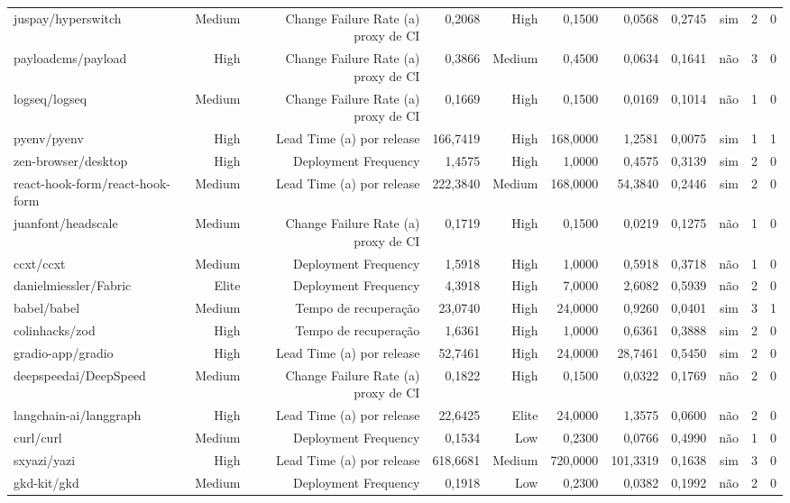 \begin{tabular}{lrrrrrrrrrr}
juspay/hyperswitch & Medium & Change Failure Rate (a) proxy de CI & 0,2068 & High & 0,1500 & 0,0568 & 0,2745 & sim & 2 & 0 \\
payloadcms/payload & High & Change Failure Rate (a) proxy de CI & 0,3866 & Medium & 0,4500 & 0,0634 & 0,1641 & não & 3 & 0 \\
logseq/logseq & Medium & Change Failure Rate (a) proxy de CI & 0,1669 & High & 0,1500 & 0,0169 & 0,1014 & não & 1 & 0 \\
pyenv/pyenv & High & Lead Time (a) por release & 166,7419 & High & 168,0000 & 1,2581 & 0,0075 & sim & 1 & 1 \\
zen-browser/desktop & High & Deployment Frequency & 1,4575 & High & 1,0000 & 0,4575 & 0,3139 & sim & 2 & 0 \\
react-hook-form/react-hook-form & Medium & Lead Time (a) por release & 222,3840 & Medium & 168,0000 & 54,3840 & 0,2446 & sim & 2 & 0 \\
juanfont/headscale & Medium & Change Failure Rate (a) proxy de CI & 0,1719 & High & 0,1500 & 0,0219 & 0,1275 & não & 1 & 0 \\
ccxt/ccxt & Medium & Deployment Frequency & 1,5918 & High & 1,0000 & 0,5918 & 0,3718 & não & 1 & 0 \\
danielmiessler/Fabric & Elite & Deployment Frequency & 4,3918 & High & 7,0000 & 2,6082 & 0,5939 & não & 2 & 0 \\
babel/babel & Medium & Tempo de recuperação & 23,0740 & High & 24,0000 & 0,9260 & 0,0401 & sim & 3 & 1 \\
colinhacks/zod & High & Tempo de recuperação & 1,6361 & High & 1,0000 & 0,6361 & 0,3888 & sim & 2 & 0 \\
gradio-app/gradio & High & Lead Time (a) por release & 52,7461 & High & 24,0000 & 28,7461 & 0,5450 & sim & 2 & 0 \\
deepspeedai/DeepSpeed & Medium & Change Failure Rate (a) proxy de CI & 0,1822 & High & 0,1500 & 0,0322 & 0,1769 & não & 2 & 0 \\
langchain-ai/langgraph & High & Lead Time (a) por release & 22,6425 & Elite & 24,0000 & 1,3575 & 0,0600 & não & 2 & 0 \\
curl/curl & Medium & Deployment Frequency & 0,1534 & Low & 0,2300 & 0,0766 & 0,4990 & não & 1 & 0 \\
sxyazi/yazi & High & Lead Time (a) por release & 618,6681 & Medium & 720,0000 & 101,3319 & 0,1638 & sim & 3 & 0 \\
gkd-kit/gkd & Medium & Deployment Frequency & 0,1918 & Low & 0,2300 & 0,0382 & 0,1992 & não & 2 & 0 \\

\end{tabular}
